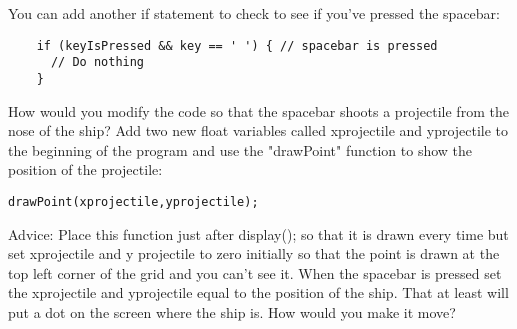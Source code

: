 \documentclass{ximera}
\begin{document}
You can add another if statement to check to see if you've pressed the spacebar:
\begin{verbatim}
    if (keyIsPressed && key == ' ') { // spacebar is pressed
      // Do nothing
    } 
\end{verbatim}

How would you modify the code so that the spacebar shoots a projectile from the nose of the ship? Add two new float variables called xprojectile and yprojectile to the beginning of the program and use the "drawPoint" function to show the position of the projectile:
\begin{verbatim}
drawPoint(xprojectile,yprojectile);
\end{verbatim}
Advice: Place this function just after display(); so that it is drawn every time but set xprojectile and y projectile to zero initially so that the point is drawn at the top left corner of the grid and you can't see it. When the spacebar is pressed set the xprojectile and yprojectile equal to the position of the ship. That at least will put a dot on the screen where the ship is. How would you make it move?
\end{document}
